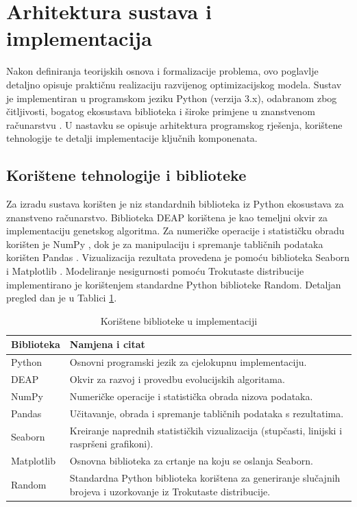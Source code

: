 \section{Arhitektura sustava i implementacija}
\label{chap:implementacija}
Nakon definiranja teorijskih osnova i formalizacije problema, ovo poglavlje detaljno opisuje praktičnu realizaciju razvijenog optimizacijskog modela. Sustav je implementiran u programskom jeziku Python (verzija 3.x), odabranom zbog čitljivosti, bogatog ekosustava biblioteka i široke primjene u znanstvenom računarstvu \cite{PythonSoftwareFoundation}. U nastavku se opisuje arhitektura programskog rješenja, korištene tehnologije te detalji implementacije ključnih komponenata.
\subsection{Korištene tehnologije i biblioteke}
Za izradu sustava korišten je niz standardnih biblioteka iz Python ekosustava za znanstveno računarstvo. Biblioteka DEAP \cite{DEAP2012} korištena je kao temeljni okvir za implementaciju genetskog algoritma. Za numeričke operacije i statističku obradu korišten je NumPy \cite{Harris2020}, dok je za manipulaciju i spremanje tabličnih podataka korišten Pandas \cite{PandasDevelopmentTeam2020}. Vizualizacija rezultata provedena je pomoću biblioteka Seaborn \cite{Waskom2021} i Matplotlib \cite{Hunter2007}. Modeliranje nesigurnosti pomoću Trokutaste distribucije implementirano je korištenjem standardne Python biblioteke Random. Detaljan pregled dan je u Tablici \ref{tab:biblioteke}.
\begin{table}[H]
\centering
\caption{Korištene biblioteke u implementaciji}
\label{tab:biblioteke}
\begin{tabular}{|l|p{10cm}|}
\hline
\textbf{Biblioteka} & \textbf{Namjena i citat} \\ \hline
Python & Osnovni programski jezik za cjelokupnu implementaciju. \cite{PythonSoftwareFoundation} \\ \hline
DEAP & Okvir za razvoj i provedbu evolucijskih algoritama. \cite{DEAP2012} \\ \hline
NumPy & Numeričke operacije i statistička obrada nizova podataka. \cite{Harris2020} \\ \hline
Pandas & Učitavanje, obrada i spremanje tabličnih podataka s rezultatima. \cite{PandasDevelopmentTeam2020} \\ \hline
Seaborn & Kreiranje naprednih statističkih vizualizacija (stupčasti, linijski i raspršeni grafikoni). \cite{Waskom2021} \\ \hline
Matplotlib & Osnovna biblioteka za crtanje na koju se oslanja Seaborn. \cite{Hunter2007} \\ \hline
Random & Standardna Python biblioteka korištena za generiranje slučajnih brojeva i uzorkovanje iz Trokutaste distribucije. \\ \hline
\end{tabular}
\end{table}


